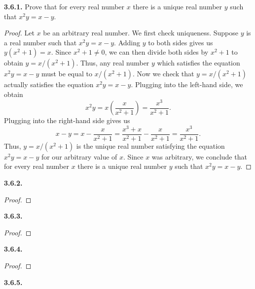 \documentclass[12pt]{amsart}
\newenvironment{statement}[1]{\smallskip\noindent\color[rgb]{.6627, .3529, .6314} {\bf #1.}}{}
\theoremstyle{definition}
\theoremstyle{remark}
\begin{document}
\begin{statement}{3.6.1}
Prove that for every real number $x$ there is a unique real number $y$ such that $x^2y = x - y$.
\end{statement}

\begin{proof}
Let $x$ be an arbitrary real number.
We first check uniqueness.
Suppose $y$ is a real number such that $x^2y = x - y$.
Adding $y$ to both sides gives us $y(x^2 + 1) = x$.
Since $x^2 + 1 \neq 0$, we can then divide both sides by $x^2 + 1$ to obtain $y = x / (x^2 + 1)$.
Thus, any real number $y$ which satisfies the equation $x^2y = x - y$ must be equal to $x / (x^2 + 1)$.
Now we check that $y = x / (x^2 + 1)$ actually satisfies the equation $x^2y = x - y$.
Plugging into the left-hand side, we obtain
\begin{equation*}
	x^2y = x \left( \frac{x}{x^2 + 1} \right) = \frac{x^3}{x^2 + 1}.
\end{equation*}
Plugging into the right-hand side gives us
\begin{equation*}
	x - y = x - \frac{x}{x^2 + 1} = \frac{x^3 + x}{x^2 + 1} - \frac{x}{x^2 + 1} 
	= \frac{x^3}{x^2 + 1}.
\end{equation*}
Thus, $y = x / (x^2 + 1)$ is the unique real number satisfying the equation $x^2y = x - y$ for our arbitrary value of $x$.
Since $x$ was arbitrary, we conclude that for every real number $x$ there is a unique real number $y$ such that $x^2y = x - y$.
\end{proof}


\begin{statement}{3.6.2}
\end{statement}

\begin{proof}
\end{proof}


\begin{statement}{3.6.3}
\end{statement}

\begin{proof}
\end{proof}


\begin{statement}{3.6.4}
\end{statement}

\begin{proof}
\end{proof}


\begin{statement}{3.6.5}
\end{statement}
\end{document}
